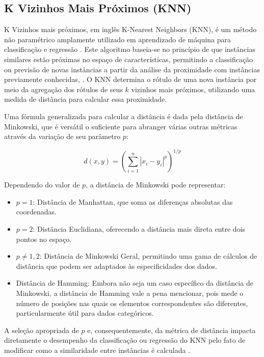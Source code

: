 \subsection{K Vizinhos Mais Próximos (KNN)}


K Vizinhos mais próximos, em inglês K-Nearest Neighbors (KNN), é um método não paramétrico amplamente utilizado em aprendizado de máquina para classificação e regressão \cite{kowsari2019text}. Este algoritmo baseia-se no princípio de que instâncias similares estão próximas no espaço de características, permitindo a classificação ou previsão de novas instâncias a partir da análise da proximidade com instâncias previamente conhecidas, \cite{cover1967}. O KNN determina o rótulo de uma nova instância por meio da agregação dos rótulos de seus \(k\) vizinhos mais próximos, utilizando uma medida de distância para calcular essa proximidade.

Uma fórmula generalizada para calcular a distância é dada pela distância de Minkowski, que é versátil o suficiente para abranger várias outras métricas através da variação de seu parâmetro \(p\):

\begin{equation}
d(x, y) = \left( \sum_{i=1}^{n} |x_i - y_i|^p \right)^{1/p}
\end{equation}

Dependendo do valor de \(p\), a distância de Minkowski pode representar:
\begin{itemize}
\item \(p=1\): Distância de Manhattan, que soma as diferenças absolutas das coordenadas.
\item \(p=2\): Distância Euclidiana, oferecendo a distância mais direta entre dois pontos no espaço.
\item \(p \neq 1,2\): Distância de Minkowski Geral, permitindo uma gama de cálculos de distância que podem ser adaptados às especificidades dos dados.
\item Distância de Hamming: Embora não seja um caso específico da distância de Minkowski, a distância de Hamming vale a pena mencionar, pois mede o número de posições nas quais os elementos correspondentes são diferentes, particularmente útil para dados categóricos.
\end{itemize}

A seleção apropriada de \(p\) e, consequentemente, da métrica de distância impacta diretamente o desempenho da classificação ou regressão do KNN pelo fato de modificar como a similaridade entre instâncias é calculada \cite{deza2009}.

